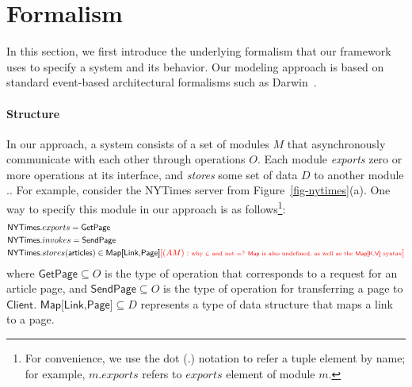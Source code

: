 
\section{Formalism}
\label{sec-formalism}

In this section, we first introduce the underlying formalism that our
framework uses to specify a system and its behavior. Our modeling
approach is based on standard event-based architectural formalisms
such as Darwin~\cite{darwin}.

\paragraph{\textbf{Structure}} In our approach, a system consists of a
set of modules $M$ that asynchronously communicate with each other
through operations $O$.  Each module \textit{exports} zero or more
operations at its interface, and \textit{stores} some set of data
$D$ to another
module ..  For
example, consider the \textsf{NYTimes} server from
Figure~\ref{fig-nytimes}(a). One way to specify this module in our
approach is as follows\footnote{For convenience, we use the dot (.)
  notation to refer a tuple element by name; for example, $m.exports$
  refers to $exports$ element of module $m$.}:
\begin{align*}
&\textsf{NYTimes}.exports = \textsf{GetPage}\\
&\textsf{NYTimes}.invokes = \textsf{SendPage}\\
&\textsf{NYTimes}.stores(\textsf{articles}) \in
\textsf{Map[Link,Page]} \am{\mbox{why $\in$ and not $=$? \textsf{Map} is also undefined, as well as the \textsf{Map[K,V]} syntax}}
\end{align*}
where $\textsf{GetPage} \subseteq O$ is the type of operation that
corresponds to a request for an article page, and $\textsf{SendPage}
\subseteq O$ is the type of operation for transferring a page to
$\textsf{Client}$. $\textsf{Map[Link,Page]} \subseteq D$ represents a
type of data structure that maps a link to a page. 

